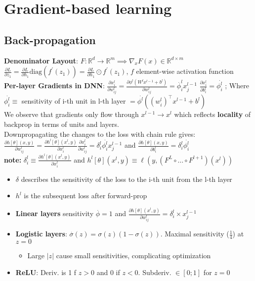 

\section{Gradient-based learning}
\subsection{Back-propagation}
\textbf{Denominator Layout}: $F: \mathbb{R}^d\to\mathbb{R}^m \implies \nabla_xF(x)\in\mathbb{R}^{d\times m}$\\
$\frac{\partial L}{\partial z_1}=\frac{\partial L}{\partial h_1}\text{diag}(f^\prime(z_1))=\frac{\partial L}{\partial h_1}\odot f^\prime(z_1)$, $f$ element-wise activation function\\


\textbf{Per-layer Gradients in DNN}: \(\frac{\partial x^l_ {i}}{\partial w^l_{ij}} = \frac{\partial \phi^l (W^l x^{l-1}+b^l)}{\partial w^l_{ij}} = \overset{.}{
\phi
}^l_i x^{l-1}_j \)
\(\frac{\partial x^l_i}{\partial b^l_i} = \overset{.}{\phi_i^l}\) ; Where \(\overset{.}{\phi_i^l} \equiv \) sensitivity of i-th unit in l-th layer $=\overset{.}{\phi^l}((w^l_{i})^\top x^{l-1}+b^l)$ \\
We observe that gradients only flow through \(x^{l-1}\rightarrow x^l\)  which reflects \textbf{locality} of backprop in terms of units and layers.\\
Downpropagating the changes to the loss with chain rule gives:\\ \(\frac{\partial
h[\theta](x,y)}{\partial w^l_{ij}} = \frac{\partial h^l[\theta](x^l,y)}{\partial x^l_i}\frac{\partial x^l_i}{\partial w^l_{ij}}=\delta^l_i \overset{.}{\phi_i^l}x_j^{l-1}\)
and \(\frac{\partial
h[\theta](x,y)}{\partial b^l_{i}} = \delta^l_i \overset{.}{\phi_i^l}\)\\
\textbf{note:} \(\delta^l_i \equiv \frac{\partial h^l[\theta](x^l,y)}{\partial x^l_i }\) and \(h^l[\theta](x^l,y) \equiv \ell (y, (F^L \circ \dots \circ F^{l+1})(x^l))  \)
\begin{itemize}
    \item $\delta$ describes the sensitivity of the loss to the i-th unit from the l-th layer
    \item $h^l$ is the subsequent loss after forward-prop
    \item \textbf{Linear layers} sensitivity $\overset{.}{\phi}= 1$ and  $\frac {\partial h[\theta](x^l,y)}{\partial w_{ij}^l}=\delta^l_i\times x^{l-1}_j $
    \item \textbf{Logistic layers}: $\overset{.}{\sigma}(z)=\sigma(z)(1-\sigma(z))$. Maximal sensitivity (\(\frac{1}{4}\)) at $z=0$
    \begin{itemize}
        \item Large $|z|$ cause small sensitivities, complicating optimization
    \end{itemize}
    \item \textbf{ReLU}: Deriv. is 1 f $z>0$ and 0 if $z<0$. Subderiv. $\in [0;1]$ for $z=0$
\end{itemize}

